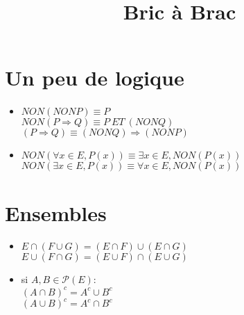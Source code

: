 \documentclass[fleqn]{article}
\title{Bric \`a Brac}
\date{}
\begin{document}
\maketitle

\section{Un peu de logique}
\begin{itemize}
	\item \(NON(NON P) \equiv  P\) \\
		\(NON(P \Rightarrow Q) \equiv P\ ET\ (NON Q)\) \\
		\((P \Rightarrow Q) \equiv (NON Q)\Rightarrow(NON P)\)
	\item \(NON(\forall x \in E, P(x)) \equiv \exists x \in E, NON(P(x)) \) \\
		\(NON(\exists x \in E, P(x)) \equiv \forall x \in E, NON(P(x)) \)
\end{itemize}

\section{Ensembles}
\begin{itemize}
	\item \(E \cap(F \cup G) = (E \cap F) \cup (E \cap G)\) \\
		\(E \cup (F \cap G) = (E \cup F) \cap (E \cup G)\)
	\item si \(A, B \in \mathcal{P}(E)\): \\
		\((A \cap B)^c = A^c \cup B^c\) \\
		\((A \cup B)^c = A^c \cap B^c\)
\end{itemize}
\end{document}
